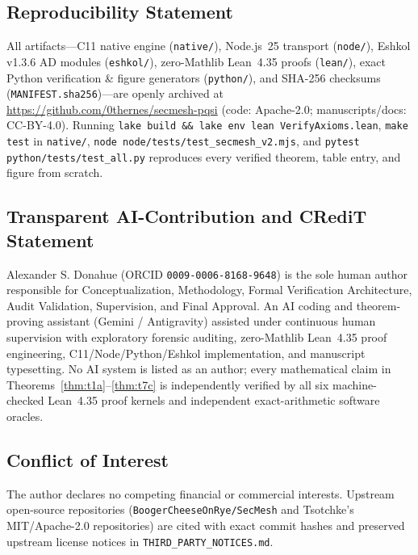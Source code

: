 \documentclass[11pt,reqno]{amsart}
\theoremstyle{definition}
\newcommand{\code}[1]{\texttt{\small #1}}
\begin{document}
\subsection*{Reproducibility Statement}
All artifacts---C11 native engine (\code{native/}), Node.js~25 transport (\code{node/}), Eshkol v1.3.6 AD modules (\code{eshkol/}), zero-Mathlib Lean~4.35 proofs (\code{lean/}), exact Python verification \& figure generators (\code{python/}), and SHA-256 checksums (\code{MANIFEST.sha256})---are openly archived at \url{https://github.com/0thernes/secmesh-pqsi} (code: Apache-2.0; manuscripts/docs: CC-BY-4.0).
Running \code{lake build \&\& lake env lean VerifyAxioms.lean}, \code{make test} in \code{native/}, \code{node node/tests/test\_secmesh\_v2.mjs}, and \code{pytest python/tests/test\_all.py} reproduces every verified theorem, table entry, and figure from scratch.

\subsection*{Transparent AI-Contribution and CRediT Statement}
Alexander S. Donahue (ORCID \code{0009-0006-8168-9648}) is the sole human author responsible for Conceptualization, Methodology, Formal Verification Architecture, Audit Validation, Supervision, and Final Approval.
An AI coding and theorem-proving assistant (Gemini / Antigravity) assisted under continuous human supervision with exploratory forensic auditing, zero-Mathlib Lean~4.35 proof engineering, C11/Node/Python/Eshkol implementation, and manuscript typesetting.
No AI system is listed as an author; every mathematical claim in Theorems~\ref{thm:t1a}--\ref{thm:t7c} is independently verified by all six machine-checked Lean~4.35 proof kernels and independent exact-arithmetic software oracles.

\subsection*{Conflict of Interest}
The author declares no competing financial or commercial interests. Upstream open-source repositories (\code{BoogerCheeseOnRye/SecMesh} and Tsotchke's MIT/Apache-2.0 repositories) are cited with exact commit hashes and preserved upstream license notices in \code{THIRD\_PARTY\_NOTICES.md}.



\end{document}
